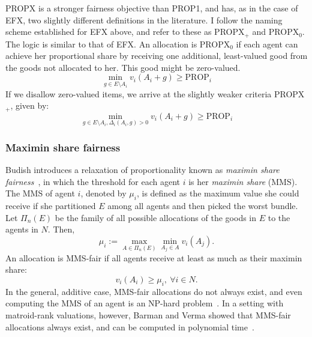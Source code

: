 PROPX is a stronger fairness objective than PROP1, and has, as in the case of EFX, two slightly different definitions in the literature. I follow the naming scheme established for EFX above, and refer to these as PROPX$_+$ and PROPX$_0$. The logic is similar to that of EFX. An allocation is PROPX$_0$ if each agent can achieve her proportional share by receiving one additional, least-valued good from the goods not allocated to her. This good might be zero-valued.
\begin{equation}\tag{PROPX$_0$}
  \min_{g\in E\setminus A_i}v_i(A_i + g)\geq\text{PROP}_i
\end{equation}
If we disallow zero-valued items, we arrive at the slightly weaker criteria PROPX$_+$, given by:
\begin{equation}\tag{PROPX$_+$}
  \min_{g\in E\setminus A_i, \Delta_i(A_i, g)>0}v_i(A_i + g)\geq\text{PROP}_i
\end{equation}

\subsubsection*{Maximin share fairness}

Budish introduces a relaxation of proportionality known as \textit{maximin share fairness}~\cite{Budish2011}, in which the threshold for each agent $i$ is her \textit{maximin share} (MMS). The MMS of agent $i$, denoted by $\mu_i$, is defined as the maximum value she could receive if she partitioned $E$ among all agents and then picked the worst bundle. Let $\Pi_n(E)$ be the family of all possible allocations of the goods in $E$ to the agents in $N$. Then,
$$\mu_i := \max_{A\in \Pi_n(E)} \min_{A_j \in A} v_i(A_j).$$
An allocation is MMS-fair if all agents receive at least as much as their maximin share:
\begin{equation} \tag{MMS}
  v_i(A_i) \geq \mu_i,\ \forall i \in N.
\end{equation}
In the general, additive case, MMS-fair allocations do not always exist, and even computing the MMS of an agent is an NP-hard problem~\cite{amanatidis2022fair}. In a setting with matroid-rank valuations, however, Barman and Verma showed that MMS-fair allocations always exist, and can be computed in polynomial time~\cite{barman2021existence}.

